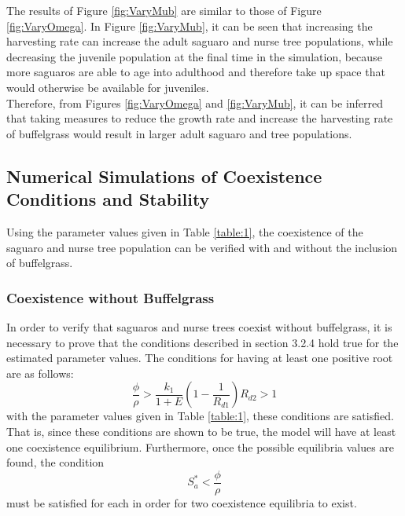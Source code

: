 \documentclass[a4paper]{article}
\begin{document}
The results of Figure \ref{fig:VaryMub} are similar to those of Figure \ref{fig:VaryOmega}. In Figure \ref{fig:VaryMub}, it can be seen that increasing the harvesting rate can increase the adult saguaro and nurse tree populations, while decreasing the juvenile population at the final time in the simulation, because more saguaros are able to age into adulthood and therefore take up space that would otherwise be available for juveniles.\\

Therefore, from Figures \ref{fig:VaryOmega} and \ref{fig:VaryMub}, it can be inferred that taking measures to reduce the growth rate and increase the harvesting rate of buffelgrass would result in larger adult saguaro and tree populations.
\subsection{Numerical Simulations of Coexistence Conditions and Stability}
Using the parameter values given in Table \ref{table:1}, the coexistence of the saguaro and nurse tree population can be verified with and without the inclusion of buffelgrass.
\subsubsection{Coexistence without Buffelgrass}
In order to verify that saguaros and nurse trees coexist without buffelgrass, it is necessary to prove that the conditions described in section 3.2.4 hold true for the estimated parameter values. The conditions for having at least one positive root are as follows:
\begin{subequations}
\begin{equation}
\displaystyle\frac{\phi}{\rho}>\displaystyle\frac{k_1}{1+E}\left(1-\displaystyle\frac{1}{R_{d1}}\right)
\end{equation}
\begin{equation}
R_{d2} > 1
\end{equation}
\end{subequations}
with the parameter values given in Table \ref{table:1}, these conditions are satisfied.
That is, since these conditions are shown to be true, the model will have at least one coexistence equilibrium. Furthermore, once the possible equilibria values are found, the condition
\begin{equation}\label{eq:exist}
S_a^*<\displaystyle\frac{\phi}{\rho}
\end{equation}
must be satisfied for each in order for two coexistence equilibria to exist.\\
\end{document}
